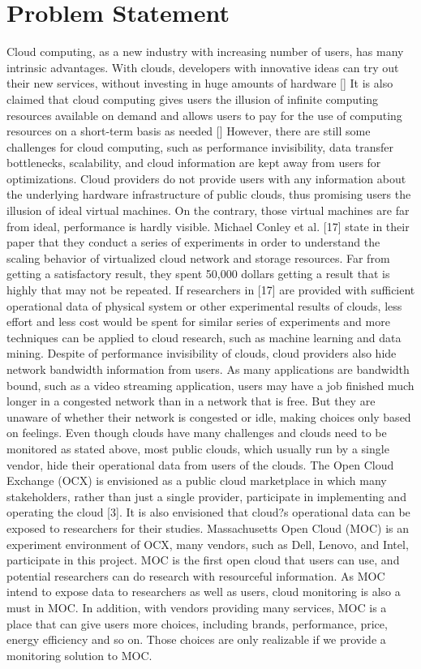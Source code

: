 \section{Problem Statement}
\label{sec:ProblemStatement}

Cloud computing, as a new industry with increasing number of users, has many intrinsic advantages. With clouds, developers with innovative ideas can try out their new services, without investing in huge amounts of hardware [] It is also claimed that cloud computing gives users the illusion of infinite computing resources available on demand and allows users to pay for the use of computing resources on a short-term basis as needed [] However, there are still some challenges for cloud computing, such as performance invisibility, data transfer bottlenecks, scalability, and cloud information are kept away from users for optimizations.
Cloud providers do not provide users with any information about the underlying hardware infrastructure of public clouds, thus promising users the illusion of ideal virtual machines. On the contrary, those virtual machines are far from ideal, performance is hardly visible. Michael Conley et al. [17] state in their paper that they conduct a series of experiments in order to understand the scaling behavior of virtualized cloud network and storage resources. Far from getting a satisfactory result, they spent 50,000 dollars getting a result that is highly that may not be repeated. If researchers in [17] are provided with sufficient operational data of physical system or other experimental results of clouds, less effort and less cost would be spent for similar series of experiments and more techniques can be applied to cloud research, such as machine learning and data mining.
Despite of performance invisibility of clouds, cloud providers also hide network bandwidth information from users. As many applications are bandwidth bound, such as a video streaming application, users may have a job finished much longer in a congested network than in a network that is free. But they are unaware of whether their network is congested or idle, making choices only based on feelings. 
Even though clouds have many challenges and clouds need to be monitored as stated above, most public clouds, which usually run by a single vendor, hide their operational data from users of the clouds. The Open Cloud Exchange (OCX) is envisioned as a public cloud marketplace in which many stakeholders, rather than just a single provider, participate in implementing and operating the cloud [3]. It is also envisioned that cloud?s operational data can be exposed to researchers for their studies. Massachusetts Open Cloud (MOC) is an experiment environment of OCX, many vendors, such as Dell, Lenovo, and Intel, participate in this project. MOC is the first open cloud that users can use, and potential researchers can do research with resourceful information. As MOC intend to expose data to researchers as well as users, cloud monitoring is also a must in MOC. In addition, with vendors providing many services, MOC is a place that can give users more choices, including brands, performance, price, energy efficiency and so on. Those choices are only realizable if we provide a monitoring solution to MOC. 
